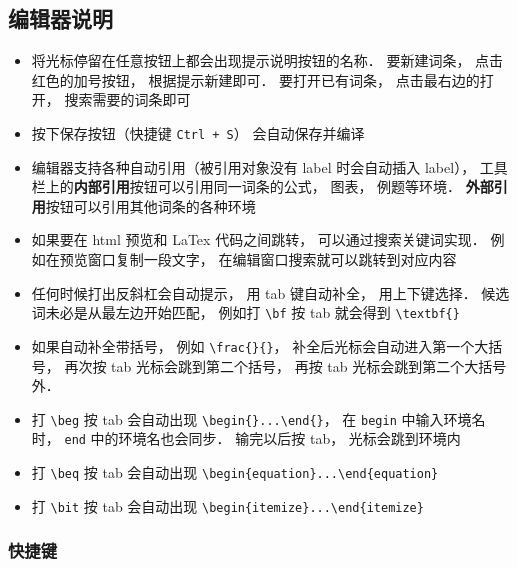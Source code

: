 \subsection{编辑器说明}
\begin{itemize}
\item 将光标停留在任意按钮上都会出现提示说明按钮的名称． 要新建词条， 点击红色的加号按钮， 根据提示新建即可． 要打开已有词条， 点击最右边的打开， 搜索需要的词条即可

\item 按下保存按钮（快捷键 \lstinline|Ctrl + S|） 会自动保存并编译

\item 编辑器支持各种自动引用（被引用对象没有 label 时会自动插入 label）， 工具栏上的\textbf{内部引用}按钮可以引用同一词条的公式， 图表， 例题等环境． \textbf{外部引用}按钮可以引用其他词条的各种环境

\item 如果要在 html 预览和 LaTex 代码之间跳转， 可以通过搜索关键词实现． 例如在预览窗口复制一段文字， 在编辑窗口搜索就可以跳转到对应内容

\item 任何时候打出反斜杠会自动提示， 用 tab 键自动补全， 用上下键选择． 候选词未必是从最左边开始匹配， 例如打 \lstinline|\bf| 按 tab 就会得到 \lstinline|\textbf{}|

\item 如果自动补全带括号， 例如 \lstinline|\frac{}{}|， 补全后光标会自动进入第一个大括号， 再次按 tab 光标会跳到第二个括号， 再按 tab 光标会跳到第二个大括号外．

\item 打 \lstinline|\beg| 按 tab 会自动出现 \lstinline|\begin{}...\end{}|， 在 \lstinline|begin| 中输入环境名时， \lstinline|end| 中的环境名也会同步． 输完以后按 tab， 光标会跳到环境内

\item 打 \lstinline|\beq| 按 tab 会自动出现 \lstinline|\begin{equation}...\end{equation}|

\item 打 \lstinline|\bit| 按 tab 会自动出现 \lstinline|\begin{itemize}...\end{itemize}|
\end{itemize}


\subsubsection{快捷键}

